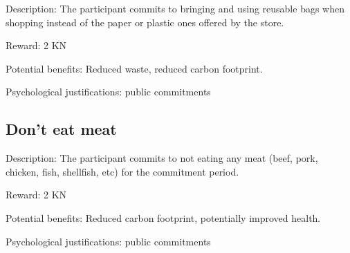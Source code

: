 Description: The participant commits to bringing and using reusable bags when shopping instead of the paper or plastic ones offered by the store.

Reward: 2 KN

Potential benefits: Reduced waste, reduced carbon footprint.

Psychological justifications: public commitments

\subsection{Don't eat meat}

Description: The participant commits to not eating any meat (beef, pork, chicken, fish, shellfish, etc) for the commitment period.

Reward: 2 KN

Potential benefits: Reduced carbon footprint, potentially improved health.

Psychological justifications: public commitments
